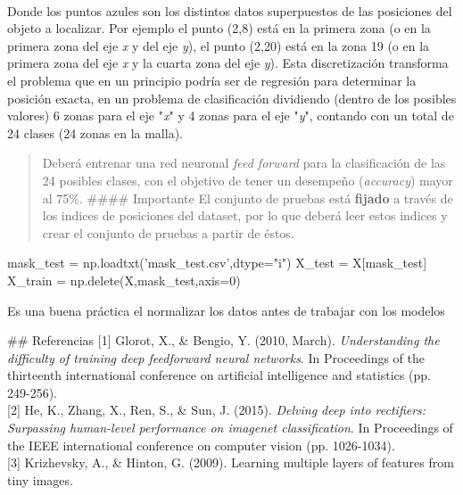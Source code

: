 \documentclass[11pt]{article}
\newenvironment{Shaded}{}{}
\newcommand{\DecValTok}[1]{\textcolor[rgb]{0.25,0.63,0.44}{{#1}}}
\newcommand{\StringTok}[1]{\textcolor[rgb]{0.25,0.44,0.63}{{#1}}}
\newcommand{\NormalTok}[1]{{#1}}
\newcommand{\OperatorTok}[1]{\textcolor[rgb]{0.40,0.40,0.40}{{#1}}}
\begin{document}
    \begin{center}
    \end{center}
    { \hspace*{\fill} \\}
    
    Donde los puntos azules son los distintos datos superpuestos de las
posiciones del objeto a localizar. Por ejemplo el punto (2,8) está en la
primera zona (o en la primera zona del eje \emph{x} y del eje \emph{y}),
el punto (2,20) está en la zona 19 (o en la primera zona del eje
\emph{x} y la cuarta zona del eje \emph{y}). Esta discretización
transforma el problema que en un principio podría ser de regresión para
determinar la posición exacta, en un problema de clasificación
dividiendo (dentro de los posibles valores) 6 zonas para el eje
"\emph{x}" y 4 zonas para el eje "\emph{y}", contando con un total de 24
clases (24 zonas en la malla).

\begin{quote}
Deberá entrenar una red neuronal \emph{feed forward} para la
clasificación de las 24 posibles clases, con el objetivo de tener un
desempeño (\emph{accuracy}) mayor al 75\%. \#\#\#\# Importante El
conjunto de pruebas está \textbf{fijado} a través de los indices de
posiciones del dataset, por lo que deberá leer estos indices y crear el
conjunto de pruebas a partir de éstos.
\end{quote}

\begin{Shaded}
\begin{Highlighting}[]
\NormalTok{mask_test }\OperatorTok{=}\NormalTok{ np.loadtxt(}\StringTok{'mask_test.csv'}\NormalTok{,dtype}\OperatorTok{=}\StringTok{"i"}\NormalTok{)}
\NormalTok{X_test }\OperatorTok{=}\NormalTok{ X[mask_test]}
\NormalTok{X_train }\OperatorTok{=}\NormalTok{ np.delete(X,mask_test,axis}\OperatorTok{=}\DecValTok{0}\NormalTok{)}
\end{Highlighting}
\end{Shaded}

Es una buena práctica el normalizar los datos antes de trabajar con los
modelos

     \#\# Referencias {[}1{]} Glorot, X., \& Bengio, Y. (2010, March).
\emph{Understanding the difficulty of training deep feedforward neural
networks}. In Proceedings of the thirteenth international conference on
artificial intelligence and statistics (pp. 249-256).\\
{[}2{]} He, K., Zhang, X., Ren, S., \& Sun, J. (2015). \emph{Delving
deep into rectifiers: Surpassing human-level performance on imagenet
classification}. In Proceedings of the IEEE international conference on
computer vision (pp. 1026-1034).\\
{[}3{]} Krizhevsky, A., \& Hinton, G. (2009). Learning multiple layers
of features from tiny images.


    
    
    
    
\end{document}
